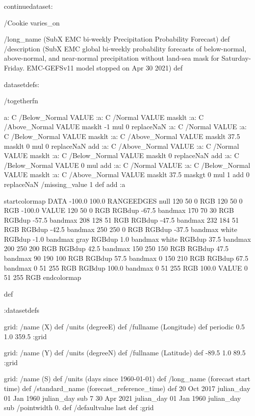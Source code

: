 \begin{ingrid}

continuedataset:


/Cookie varies_on


/long_name (SubX EMC bi-weekly Precipitation Probability Forecast) def
/description (SubX EMC global bi-weekly probability forecasts of below-normal, above-normal, and near-normal precipitation without land-sea mask for Saturday-Friday. EMC-GEFSv11 model stopped on Apr 30 2021) def

datasetdefs:

/togetherfn {
 a:
    C /Below_Normal VALUE
    :a:
     C /Normal VALUE
     masklt
    :a:
     C /Above_Normal VALUE
     masklt
    -1 mul
    0 replaceNaN
    :a:
     C /Normal VALUE
     :a:
      C /Below_Normal VALUE
      masklt
     :a:
      C /Above_Normal VALUE
      masklt
     37.5 masklt
     0 mul
     0 replaceNaN           
     add
    :a:
     C /Above_Normal VALUE
     :a:
      C /Normal VALUE
      masklt
     :a:
      C /Below_Normal VALUE
      masklt
     0 replaceNaN
     add
 :a:
     C /Below_Normal VALUE
     0 mul
     add
    :a:
     C /Normal VALUE
     :a:
      C /Below_Normal VALUE
      masklt
     :a:
      C /Above_Normal VALUE        
      masklt
     37.5 maskgt
     0 mul
     1 add
     0 replaceNaN
     /missing_value 1 def
     add
    :a

startcolormap
DATA -100.0 100.0 RANGEEDGES
null 120 50 0 RGB
120 50 0 RGB -100.0 VALUE
120 50 0 RGB RGBdup -67.5 bandmax
170 70 30 RGB RGBdup -57.5 bandmax
208 128 51 RGB RGBdup -47.5 bandmax
232 184 51 RGB RGBdup -42.5 bandmax
250 250 0 RGB RGBdup -37.5 bandmax
white RGBdup -1.0 bandmax
gray RGBdup 1.0 bandmax
white RGBdup 37.5 bandmax
200 250 200 RGB RGBdup 42.5 bandmax
150 250 150 RGB RGBdup 47.5 bandmax
90 190 100 RGB RGBdup 57.5 bandmax
0 150 210 RGB RGBdup 67.5 bandmax
0 51 255 RGB RGBdup 100.0 bandmax
0 51 255 RGB 100.0 VALUE
0 51 255 RGB
endcolormap
} def 

:datasetdefs


grid:
/name (X) def
/units (degreeE) def
/fullname (Longitude) def
periodic
0.5 1.0 359.5
:grid

grid:
/name (Y) def
/units (degreeN) def
/fullname (Latitude) def
-89.5 1.0 89.5
:grid


grid:
/name (S) def
/units (days since 1960-01-01) def
/long_name (forecast start time) def
/standard_name (forecast_reference_time) def
20 Oct 2017 julian_day 01 Jan 1960 julian_day sub
7
30 Apr 2021 julian_day 01 Jan 1960 julian_day sub
/pointwidth 0. def
/defaultvalue { last } def
:grid


\end{ingrid}
